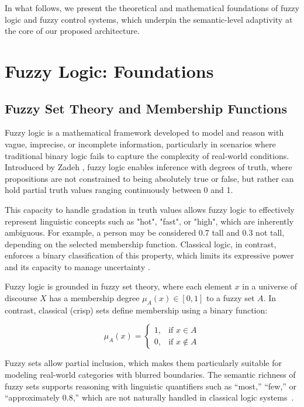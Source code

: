 In what follows, we present the theoretical and mathematical foundations of fuzzy logic and fuzzy control systems, which underpin the semantic-level adaptivity at the core of our proposed architecture.


\section{Fuzzy Logic: Foundations}


\subsection{Fuzzy Set Theory and Membership Functions}
Fuzzy logic is a mathematical framework developed to model and reason with vague, imprecise, or incomplete information, particularly in scenarios where traditional binary logic fails to capture the complexity of real-world conditions. Introduced by Zadeh \parencite{zadeh1983role, zadeh1992knowledge}, fuzzy logic enables inference with degrees of truth, where propositions are not constrained to being absolutely true or false, but rather can hold partial truth values ranging continuously between 0 and 1.

This capacity to handle gradation in truth values allows fuzzy logic to effectively represent linguistic concepts such as "hot", "fast", or "high", which are inherently ambiguous. For example, a person may be considered 0.7 tall and 0.3 not tall, depending on the selected membership function. Classical logic, in contrast, enforces a binary classification of this property, which limits its expressive power and its capacity to manage uncertainty \parencite{sabahi2013qualified, yen1999fuzzy}.

Fuzzy logic is grounded in fuzzy set theory, where each element $x$ in a universe of discourse $X$ has a membership degree $\mu_A(x) \in [0, 1]$ to a fuzzy set $A$. In contrast, classical (crisp) sets define membership using a binary function:

\begin{equation}
\mu_A(x) =
\begin{cases}
1, & \text{if } x \in A \\
0, & \text{if } x \notin A
\end{cases}
\label{eq:crisp-membership}
\end{equation}

Fuzzy sets allow partial inclusion, which makes them particularly suitable for modeling real-world categories with blurred boundaries. The semantic richness of fuzzy sets supports reasoning with linguistic quantifiers such as ``most,'' ``few,'' or ``approximately 0.8,'' which are not naturally handled in classical logic systems~\parencite{liberatore2002project, zadeh1983role}.



